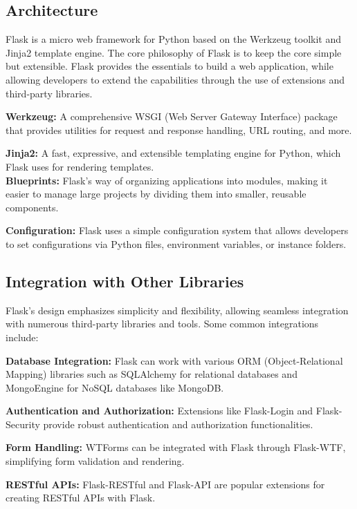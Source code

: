 \subsection{Architecture}

Flask is a micro web framework for Python based on the Werkzeug toolkit and Jinja2 template engine. The core philosophy of Flask is to keep the core simple but extensible. Flask provides the essentials to build a web application, while allowing developers to extend the capabilities through the use of extensions and third-party libraries.

\textbf{Werkzeug:} A comprehensive WSGI (Web Server Gateway Interface) package that provides utilities for request and response handling, URL routing, and more.

\textbf{Jinja2:} A fast, expressive, and extensible templating engine for Python, which Flask uses for rendering templates.\\

\textbf{Blueprints:} Flask's way of organizing applications into modules, making it easier to manage large projects by dividing them into smaller, reusable components.

\textbf{Configuration:} Flask uses a simple configuration system that allows developers to set configurations via Python files, environment variables, or instance folders.

\subsection{Integration with Other Libraries}

Flask's design emphasizes simplicity and flexibility, allowing seamless integration with numerous third-party libraries and tools. Some common integrations include:

\textbf{Database Integration:} Flask can work with various ORM (Object-Relational Mapping) libraries such as SQLAlchemy for relational databases and MongoEngine for NoSQL databases like MongoDB.

\textbf{Authentication and Authorization:} Extensions like Flask-Login and Flask-Security provide robust authentication and authorization functionalities.

\textbf{Form Handling:} WTForms can be integrated with Flask through Flask-WTF, simplifying form validation and rendering.

\textbf{RESTful APIs:} Flask-RESTful and Flask-API are popular extensions for creating RESTful APIs with Flask.

